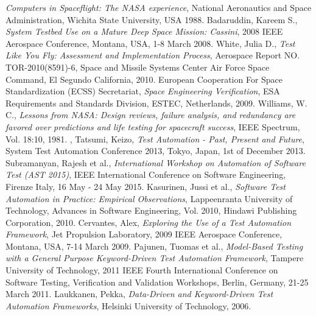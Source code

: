 \documentclass[english,12pt,a4paper,pdftex,elec,utf8]{aaltothesis}
\begin{document}
\begin{thebibliography}{99}
  \textit{Computers in Spaceflight: The NASA experience}, National Aeronautics and Space Administration, Wichita State University, USA 1988.
 Badaruddin, Kareem S.,
  \textit{System Testbed Use on a Mature Deep Space Mission: Cassini}, 2008 IEEE Aerospace Conference, Montana, USA, 1-8 March 2008.
 White, Julia D.,
  \textit{Test Like You Fly: Assessment and Implementation Process}, Aerospace Report NO.
TOR-2010(8591)-6, Space and Missile Systems Center Air Force Space Command, El Segundo California, 2010.
 European Cooperation For Space Standardization (ECSS) Secretariat,
  \textit{Space Engineering Verification}, ESA Requirements and Standards Division, ESTEC, Netherlands, 2009.
 Williams, W. C.,
  \textit{Lessons from NASA: Design reviews, failure analysis, and redundancy are favored over predictions and life testing for spacecraft success}, IEEE Spectrum, Vol. 18:10, 1981.
, Tatsumi, Keizo,
  \textit{Test Automation - Past, Present and Future}, System Test Automation Conference 2013,  Tokyo, Japan, 1st of December 2013.
 Subramanyan, Rajesh et al.,
  \textit{ International Workshop on Automation of Software Test (AST 2015)},  IEEE International Conference on Software Engineering, Firenze Italy, 16 May - 24 May 2015.
 Kasurinen, Jussi et al.,
  \textit{Software Test Automation in Practice: Empirical Observations}, Lappeenranta University of Technology, Advances in Software Engineering, Vol. 2010, Hindawi Publishing Corporation, 2010.
 Cervantes, Alex,
  \textit{Exploring the Use of a Test Automation Framework}, Jet Propulsion Laboratory, 2009 IEEE Aerospace Conference, Montana, USA, 7-14 March 2009.
 Pajunen, Tuomas et al.,
  \textit{Model-Based Testing with a General Purpose Keyword-Driven Test Automation
Framework}, Tampere University of Technology, 2011 IEEE Fourth International Conference on Software Testing, Verification and Validation Workshops, Berlin, Germany, 21-25 March 2011.  
 Laukkanen, Pekka,
  \textit{Data-Driven and Keyword-Driven Test Automation Frameworks}, Helsinki University of Technology, 2006.

\end{thebibliography}
\end{document}
